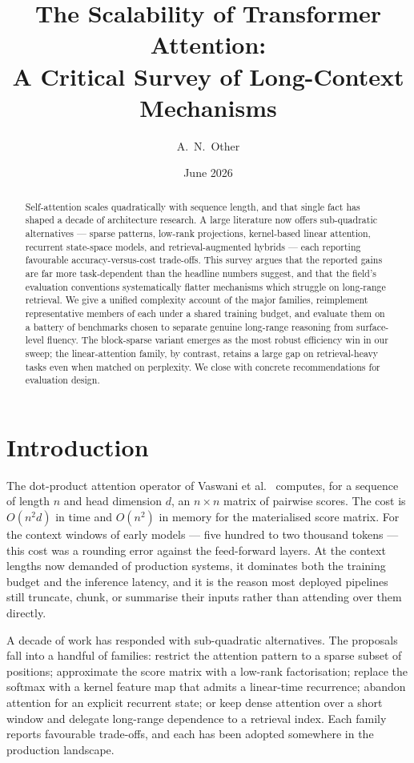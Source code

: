 \documentclass[11pt]{article}
\title{The Scalability of Transformer Attention:\\A Critical Survey of Long-Context Mechanisms}
\author{A.\ N.\ Other}
\date{June 2026}
\begin{document}
\maketitle

\begin{abstract}
Self-attention scales quadratically with sequence length, and that single fact has shaped a decade of architecture research. A large literature now offers sub-quadratic alternatives --- sparse patterns, low-rank projections, kernel-based linear attention, recurrent state-space models, and retrieval-augmented hybrids --- each reporting favourable accuracy-versus-cost trade-offs. This survey argues that the reported gains are far more task-dependent than the headline numbers suggest, and that the field's evaluation conventions systematically flatter mechanisms which struggle on long-range retrieval. We give a unified complexity account of the major families, reimplement representative members of each under a shared training budget, and evaluate them on a battery of benchmarks chosen to separate genuine long-range reasoning from surface-level fluency. The block-sparse variant emerges as the most robust efficiency win in our sweep; the linear-attention family, by contrast, retains a large gap on retrieval-heavy tasks even when matched on perplexity. We close with concrete recommendations for evaluation design.
\end{abstract}

\tableofcontents

\section{Introduction}
\label{sec:introduction}

The dot-product attention operator of Vaswani et al.~\cite{vaswani2017attention} computes, for a sequence of length $n$ and head dimension $d$, an $n \times n$ matrix of pairwise scores. The cost is $O(n^2 d)$ in time and $O(n^2)$ in memory for the materialised score matrix. For the context windows of early models --- five hundred to two thousand tokens --- this cost was a rounding error against the feed-forward layers. At the context lengths now demanded of production systems, it dominates both the training budget and the inference latency, and it is the reason most deployed pipelines still truncate, chunk, or summarise their inputs rather than attending over them directly.

A decade of work has responded with sub-quadratic alternatives. The proposals fall into a handful of families: restrict the attention pattern to a sparse subset of positions; approximate the score matrix with a low-rank factorisation; replace the softmax with a kernel feature map that admits a linear-time recurrence; abandon attention for an explicit recurrent state; or keep dense attention over a short window and delegate long-range dependence to a retrieval index. Each family reports favourable trade-offs, and each has been adopted somewhere in the production landscape.
\end{document}
